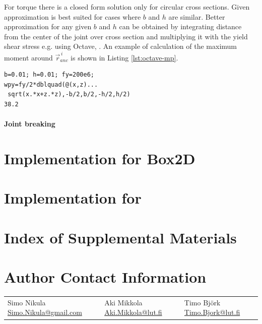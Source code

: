 \documentclass{jcgt}
\begin{document}
For torque there is a closed form solution only for
circular cross sections.
Given approximation is 
best suited for cases where $b$ and $h$ are similar.
Better approximation for any given $b$ and $h$ can be obtained 
by integrating distance from the center of the joint over cross section and
multiplying it with the yield shear stress e.g. using Octave, \cite{octave}.
An example of calculation of the maximum moment  around $\vec{r}_{anc}^{\,i} $
is shown in Listing \ref{lst:octave-mp}.

\lstset{language=octave}
\begin{lstlisting}[caption={Calculation of maximum moment  around $\vec{r}_{anc}^{\,i} $ using Octave.}, 
label={lst:octave-mp}, float]
b=0.01; h=0.01; fy=200e6;
wpy=fy/2*dblquad(@(x,z)...
 sqrt(x.*x+z.*z),-b/2,b/2,-h/2,h/2)
38.2
\end{lstlisting}


\paragraph{Joint breaking}


\section{Implementation for Box2D}

\section{Implementation for \cbullet}

\small



\section*{Index of Supplemental Materials}

\section*{Author Contact Information}

\hspace{-2mm}\begin{tabular}{p{}p{}p{}}
Simo Nikula\newline
\href{mailto:Simo.Nikula@gmail.com}{Simo.Nikula@gmail.com}
&
Aki Mikkola\newline
\href{mailto:Aki.Mikkola@lut.fi}{Aki.Mikkola@lut.fi}
&
Timo Björk\newline
\href{mailto:Timo.Bjork@lut.fi}{Timo.Bjork@lut.fi}
\end{tabular}


\afterdoc
\end{document}
